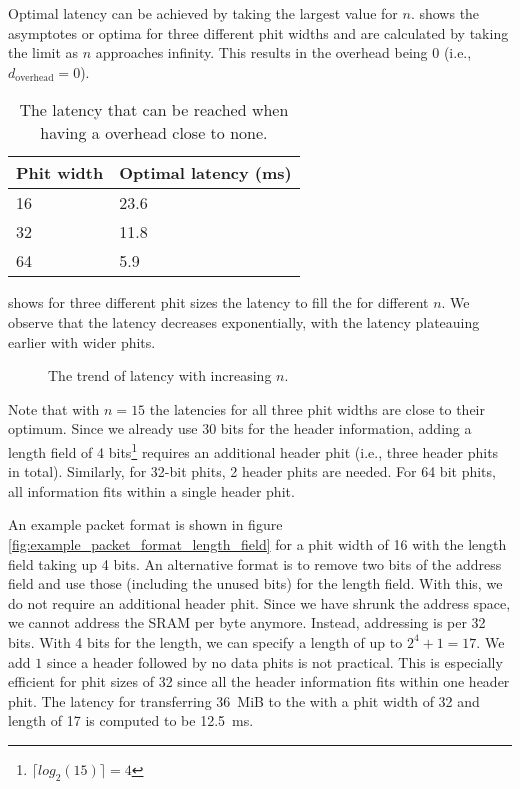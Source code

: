 Optimal latency can be achieved by taking the largest value for $n$.
 shows the asymptotes or optima for three different phit widths and are calculated by taking the limit as $n$ approaches infinity.
This results in the overhead being $0$ (i.e., $d_{\text{overhead}} = 0$).

\begin{table}[hbtp]
\centering
\begin{tabular}{@{}ll@{}}
\toprule
\textbf{Phit width} & \textbf{Optimal latency (ms)} \\ \midrule
16        & 23.6                  \\
32        & 11.8                  \\
64        & 5.9                   \\ \bottomrule
\end{tabular}
\caption{The latency that can be reached when having a overhead close to none.}
\label{tab:length_field_optimal_latency}
\end{table}

 shows for three different phit sizes the latency to fill the \graicore{} for different $n$.
We observe that the latency decreases exponentially, with the latency plateauing earlier with wider phits.

\begin{figure}
    \centering
    
    \caption{The trend of latency with increasing $n$.}
    \label{fig:n_vs_latency}
\end{figure}

Note that with $n=15$ the latencies for all three phit widths are close to their optimum.
Since we already use 30 bits for the header information, adding a length field of 4 bits\footnote{$\lceil log_{2}( 15 )\rceil = 4$} requires an additional header phit (i.e., three header phits in total). Similarly, for 32-bit phits, 2 header phits are needed. For 64 bit phits, all information fits within a single header phit.

An example packet format is shown in figure \cref{fig:example_packet_format_length_field} for a phit width of 16 with the length field taking up 4 bits.
An alternative format is to remove two bits of the address field and use those (including the unused bits) for the length field.
With this, we do not require an additional header phit.
Since we have shrunk the address space, we cannot address the SRAM per byte anymore.
Instead, addressing is per 32 bits.
With 4 bits for the length, we can specify a length of up to $2^4 + 1 = 17$.
We add $1$ since a header followed by no data phits is not practical.
This is especially efficient for phit sizes of 32 since all the header information fits within one header phit.
The latency for transferring \SI{36}{MiB} to the \graicore{} with a phit width of 32 and length of 17 is computed to be \SI{12.5}{ms}.

